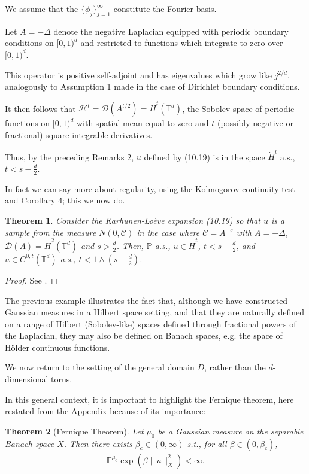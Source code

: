 \documentclass[oneside,11pt]{book}
\numberwithin{equation}{section}
\newtheorem{theorem}{Theorem}[section]
\begin{document}
We assume that the $\{\phi_j\}_{j=1}^\infty$ constitute the Fourier basis.

Let $A = -\Delta$ denote the negative Laplacian equipped with periodic boundary conditions on $[0,1)^d$ and restricted to functions which integrate to zero over $[0,1)^d$.

This operator is positive self-adjoint and has eigenvalues which grow like $j^{2/d}$, analogously to Assumption 1 made in the case of Dirichlet boundary conditions.

It then follows that $\mathcal{H}^t = \mathcal{D}(A^{t/2}) = \dot{H}^t(\mathbb{T}^d)$, the Sobolev space of periodic functions on $[0,1)^d$ with spatial mean equal to zero and $t$ (possibly negative or fractional) square integrable derivatives.

Thus, by the preceding Remarks 2, $u$ defined by (10.19) is in the space $\dot{H}^t$ a.s., $t < s - \frac{d}{2}$.

In fact we can say more about regularity, using the Kolmogorov continuity test and Corollary 4; this we now do.

\begin{theorem}
    Consider the Karhunen-Loève expansion (10.19) so that $u$ is a sample from the measure $N(0,\mathcal{C})$ in the case where $\mathcal{C} = A^{-s}$ with $A = -\Delta$, $\mathcal{D}(A) = \dot{H}^2(\mathbb{T}^d)$ and $s > \frac{d}{2}$. Then, $\mathbb{P}$-a.s., $u\in\dot{H}^t$, $t < s - \frac{d}{2}$, and $u\in C^{0,t}(\mathbb{T}^d)$ a.s., $t < 1\wedge(s - \frac{d}{2})$.
\end{theorem}

\begin{proof}
    See \cite[p. 333]{Dashti_Stuart2017}.
\end{proof}
The previous example illustrates the fact that, although we have constructed Gaussian measures in a Hilbert space setting, and that they are naturally defined on a range of Hilbert (Sobolev-like) spaces defined through fractional powers of the Laplacian, they may also be defined on Banach spaces, e.g. the space of H\"older continuous functions.

We now return to the setting of the general domain $D$, rather than the $d$-dimensional torus.

In this general context, it is important to highlight the Fernique theorem, here restated from the Appendix because of its importance:

\begin{theorem}[Fernique Theorem]
    Let $\mu_0$ be a Gaussian measure on the separable Banach space $X$. Then there exists $\beta_c\in(0,\infty)$ s.t., for all $\beta\in(0,\beta_c)$,
    \begin{align*}
        \mathbb{E}^{\mu_0}\exp(\beta\|u\|_X^2) < \infty.
    \end{align*}
\end{theorem}
\end{document}
